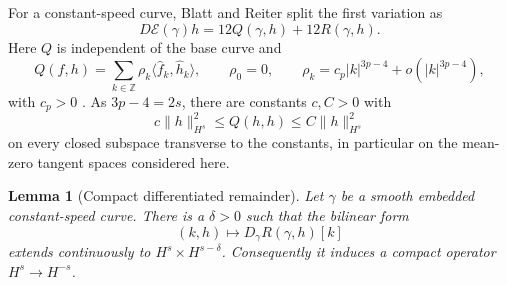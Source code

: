 \documentclass[11pt]{article}
\newtheorem{lemma}[theorem]{Lemma}
\theoremstyle{remark}
\newcommand{\E}{\mathcal E}
\begin{document}
For a constant-speed curve, Blatt and Reiter split the first variation as
\begin{equation}\label{eq:split}
 D\E(\gamma)h=12Q(\gamma,h)+12R(\gamma,h).
\end{equation}
Here $Q$ is independent of the base curve and
\begin{equation}\label{eq:Qsymbol}
 Q(f,h)=\sum_{k\in\mathbb Z}\rho_k
 \langle\widehat f_k,\widehat h_k\rangle,\qquad
 \rho_0=0,\qquad \rho_k=c_p|k|^{3p-4}+o(|k|^{3p-4}),
\end{equation}
with $c_p>0$ \cite[Proposition 4.1]{BR}.  As $3p-4=2s$, there are constants
$c,C>0$ with
\begin{equation}\label{eq:coercive}
 c\|h\|_{H^s}^2\le Q(h,h)\le C\|h\|_{H^s}^2
\end{equation}
on every closed subspace transverse to the constants, in particular on the
mean-zero tangent spaces considered here.

\begin{lemma}[Compact differentiated remainder]\label{lem:compactR}
Let $\gamma$ be a smooth embedded constant-speed curve.  There is a
$\delta>0$ such that the bilinear form
\[
 (k,h)\longmapsto D_\gamma R(\gamma,h)[k]
\]
extends continuously to $H^s\times H^{s-\delta}$.  Consequently it induces
a compact operator $H^s\to H^{-s}$.
\end{lemma}
\end{document}
